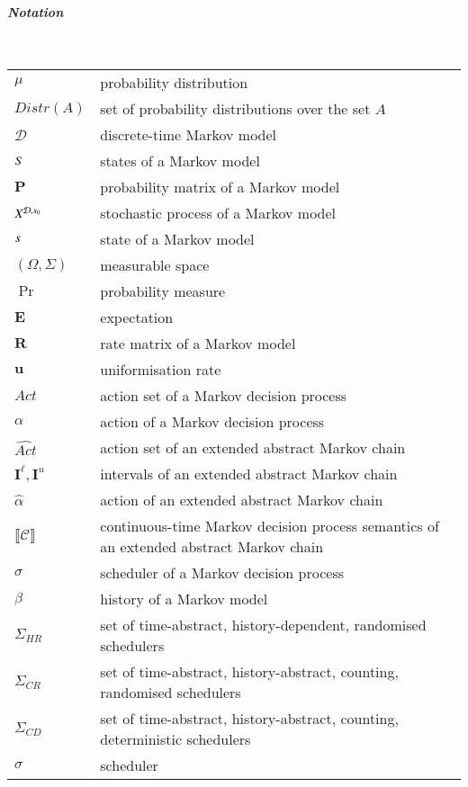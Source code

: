 \documentclass[10pt,twocolumn]{article}
\DeclareMathOperator{\prob}{Pr}
\newcommand{\states} {{\ensuremath S}}
\newcommand{\state}  {{\ensuremath s}}
\newcommand{\distr}  {{\ensuremath {\mu}}}
\newcommand{\distrs} {{\ensuremath {\mathit{Distr}}}}
\newcommand{\sched}  {{\ensuremath {\sigma}}}
\newcommand{\acts}{\mathit{Act}}
\newcommand{\pmat}{\mathbf{P}}
\newcommand{\rmat}{\mathbf{R}}
\newcommand{\dmodel}{\mathcal{D}}
\newcommand{\cmodel}{\mathcal{C}}
\newcommand{\mpath}{\beta}
\newcommand{\urate}{\mathbf{u}}
\newcommand{\act}{\alpha}
\newcommand{\schedshr}{\Sigma_\mathit{HR}}
\newcommand{\schedscr}{\Sigma_\mathit{CR}}
\newcommand{\schedscd}{\Sigma_\mathit{CD}}
\newcommand{\expect}{\mathbf{E}}
\newcommand{\stopro}{X}
\newcommand{\ivall}{{\mathbf{I}^{\ell}}}
\newcommand{\ivalu}{{\mathbf{I}^u}}
\newcommand{\sem}[1]{\ensuremath{\llbracket #1 \rrbracket}\xspace}
\begin{document}
\paragraph*{\itshape Notation}\ \\
\begin{supertabular}{p{1.6cm}p{5.7cm}}
  $\distr$ & probability distribution\\
  $\distrs(A)$ & set of probability distributions over the set $A$\\
  $\dmodel$ & discrete-time Markov model\\
  $\states$ & states of a Markov model\\
  $\pmat$ & probability matrix of a Markov model\\
  $\stopro^{\dmodel,\state_0}$ & stochastic process of a Markov model\\
  $\state$ & state of a Markov model\\
  $(\Omega,\Sigma)$ & measurable space\\
  $\prob$ & probability measure\\
  $\expect$ & expectation\\
  $\rmat$ & rate matrix of a Markov model\\
  $\urate$ & uniformisation rate\\
  $\acts$ & action set of a Markov decision process\\
  $\act$ & action of a Markov decision process\\
  $\widehat{\acts}$ & action set of an extended abstract Markov chain\\
  $\ivall, \ivalu$ & intervals of an extended abstract Markov chain\\
  $\hat{\act}$ & action of an extended abstract Markov chain\\
  $\sem{\cmodel}$ & continuous-time Markov decision process semantics of an extended abstract Markov chain\\
  $\sched$ & scheduler of a Markov decision process\\
  $\mpath$ & history of a Markov model\\
  $\schedshr$ & set of time-abstract, history-dependent, randomised schedulers\\
  $\schedscr$ & set of time-abstract, history-abstract, counting, randomised schedulers\\
  $\schedscd$ & set of time-abstract, history-abstract, counting, deterministic schedulers\\
  $\sched$ & scheduler\\

\end{supertabular}
\end{document}
